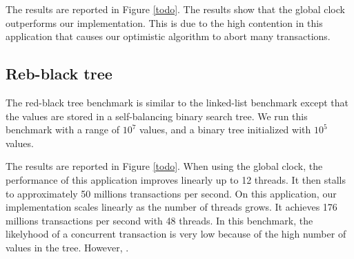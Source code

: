 The results are reported in Figure \ref{todo}.
%
The results show that the global clock outperforms our
implementation. This is due to the high contention in this application
that causes our optimistic algorithm to abort  many transactions.

\subsection{Reb-black tree}

The red-black tree benchmark is similar to the linked-list benchmark
except that the values are stored in a self-balancing binary search
tree. We run this benchmark with a range of $10^7$ values, and a
binary tree initialized with $10^5$ values.

The results are reported in Figure \ref{todo}.
%
When using the global clock, the performance of this application
improves linearly up to 12 threads. It then stalls to approximately 50
millions transactions per second.
%
On this application, our implementation scales linearly as the number
of threads grows. It achieves 176 millions transactions per second
with 48 threads.
%
In this benchmark, the likelyhood of a concurrent transaction is very
low because of the high number of values in the tree. However,
.
%
